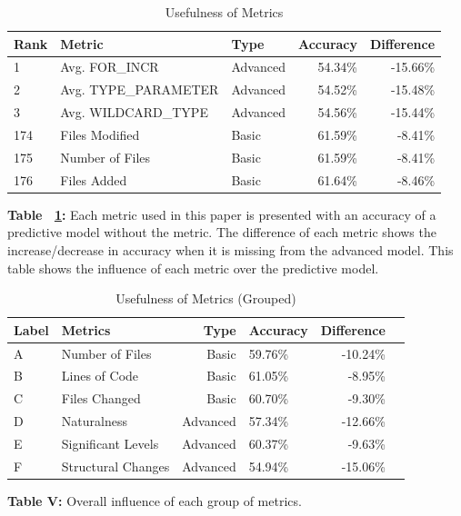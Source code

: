 \documentclass[10pt, conference]{IEEEtran}
\begin{document}
\begin{table}[h!]
  \centering
  \caption{Usefulness of Metrics}
  \label{figureUsefulness}
  \begin{tabular}{p{0.5cm} l | l r r}
    \toprule
    \textbf{Rank}&\textbf {Metric} & \textbf{Type} & \textbf{Accuracy} & \textbf{Difference}\\ %
    \midrule
    1 & Avg. FOR\_INCR & Advanced & 54.34\% & -15.66\%\\ %
    2 &  Avg. TYPE\_PARAMETER & Advanced & 54.52\% & -15.48\%\\ %
    3 & Avg. WILDCARD\_TYPE & Advanced & 54.56\% & -15.44\%\\  %
     174 & Files Modified & Basic & 61.59\% & -8.41\%\\ %
     175 & Number of Files & Basic & 61.59\% & -8.41\%\\%
     176 & Files Added & Basic & 61.64\% & -8.46\%\\  %
    \bottomrule
  \end{tabular}
  \break
  \break
\textbf{Table ~\ref{figureUsefulness}:} Each metric used in this paper is presented with an accuracy of a predictive model without the metric. The difference of each metric shows the increase/decrease in accuracy when it is missing from the advanced model. This table shows the influence of each metric over the predictive model.
\end{table}

\begin{table}[h!]
   \centering
   \caption{ Usefulness of Metrics (Grouped)}
   \label{tab:Figure VII}
   \begin{tabular}{ll|rlrr}
     \toprule
      \textbf {Label} & \textbf {Metrics} & \textbf{Type} & \textbf{Accuracy} & \textbf{Difference}\\%
     \midrule
     A & Number of Files & Basic & 59.76\% & -10.24\%\\ %
     B &  Lines of Code & Basic & 61.05\% & -8.95\%\\ %
     C & Files Changed & Basic & 60.70\% & -9.30\%\\ %
     D & Naturalness & Advanced & 57.34\% & -12.66\%\\ %
     E & Significant Levels & Advanced & 60.37\% & -9.63\%\\ %
     F & Structural Changes & Advanced & 54.94\% & -15.06\%\\%
     \bottomrule
   \end{tabular}
   \break
  \break
 \textbf{Table V:} Overall influence of each group of metrics. 
 \end{table}
\end{document}
